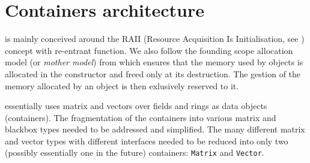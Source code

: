 \section{Containers architecture}\label{sec:container}
%
\linbox is mainly conceived around the RAII (Resource Acquisition Is
Initialisation, see \cite{stroustrup1994design}) concept with re-entrant
function. We also follow the {founding scope allocation} model (or \emph{mother
model}) from \cite{Dumas:2010:lbpar} which ensures that the memory used by
objects is allocated in the constructor and freed only at its destruction. The
gestion of the memory allocated by an object is then exlusively reserved to it.
%
\par
%
\linbox essentially uses matrix and vectors over fields and rings as data objects
(containers).  The fragmentation of the containers into various matrix and
blackbox types needed to be addressed and simplified. The many different matrix and
vector types with different interfaces needed to be reduced into only two
(possibly essentially one in the future) containers: \texttt{Matrix} and
\texttt{Vector}.
%
